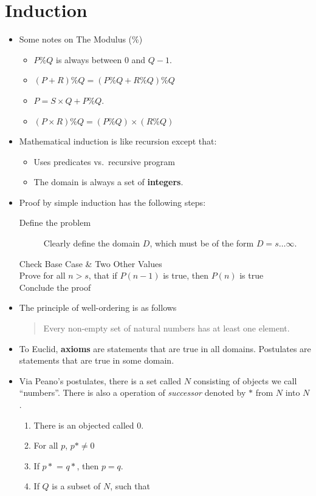 \documentclass[12pt]{scrartcl}
\begin{document}
\section{Induction}
\begin{itemize}
    \item Some notes on The Modulus (\%)
        \begin{itemize}
            \item $P \% Q$ is always between $0$ and $Q - 1$.
            \item $(P + R) \% Q = (P \% Q + R \% Q) \% Q$
            \item $P = S \times Q + P \% Q$.
            \item $(P \times R) \% Q = (P \% Q) \times (R \% Q)$
        \end{itemize}

    \item Mathematical induction is like recursion except that:
        \begin{itemize}
            \item Uses predicates vs.\ recursive program
            \item The domain is always a set of \textbf{integers}.
        \end{itemize}

    \item Proof by simple induction has the following steps:
        \begin{description}
            \item[Define the problem] Clearly define the domain $D$, which must be of the form $D = s \ldots \infty$.
            \item[Check Base Case \& Two Other Values]
            \item[Prove for all $n > s$, that if $P(n - 1)$ is true, then $P(n)$ is true]
            \item[Conclude the proof]
        \end{description}

    \item The principle of well-ordering is as follows

        \begin{quote}
            Every non-empty set of natural numbers has at least one element.
        \end{quote}

    \item To Euclid, \textbf{axioms} are statements that are true in all domains. Postulates are statements that are true in some domain.
    \item Via Peano's postulates, there is a set called $N$ consisting of objects we call ``numbers''. There is also a operation of \textit{successor} denoted by $*$ from $N$ into $N$.
        \begin{enumerate}
            \item There is an objected called $0$.
            \item For all $p$, $p* \neq 0$
            \item If $p*$ = $q*$, then $p = q$.
            \item If $Q$ is a subset of $N$, such that


\end{enumerate}
\end{itemize}
\end{document}
